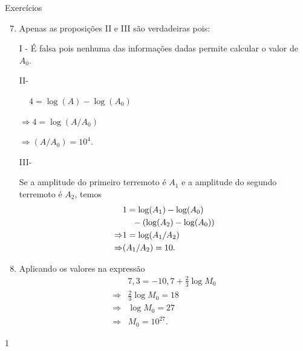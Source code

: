 \begin{answer}{Exercícios}
{\exerciselist
\begin{enumerate}\setcounter{enumi}{6}
\item Apenas as proposições II e III são verdadeiras pois:

I - É falsa pois nenhuma das informações dadas permite calcular o valor de $A_0$.

II- \hspace{30mm}\begin{minipage}[t]{0.8\linewidth}
$\,\,\,\,\,\,\,4 = \log (A) - \log (A_0)$

$\Rightarrow 4 = \log (A/A_0)$

$\Rightarrow (A/A_0) = 10^4.$
\end{minipage}

III- \begin{minipage}[t]{0.8\linewidth}
Se a amplitude do primeiro terremoto é $A_1$ e a amplitude do segundo terremoto é $A_2$, temos
\begin{align*}
&1 = \log (A_1) - \log (A_0)\\
& \hspace{4mm}- (\log (A_2) - \log (A_0))\\
\Rightarrow &1 = \log (A_1/A_2)\\
\Rightarrow &(A_1/A_2) = 10.
\end{align*}
\end{minipage}

\item Aplicando os valores na expressão
\begin{align*}
&7{,}3 = -10{,}7+\frac{2}{3} \log M_0\\
\Rightarrow & \frac{2}{3} \log M_0 = 18\\
\Rightarrow & \log M_0 = 27\\
\Rightarrow & M_0 = 10^{27}.
\end{align*}
\end{enumerate}
}{1}
\end{answer}
\clearmargin
